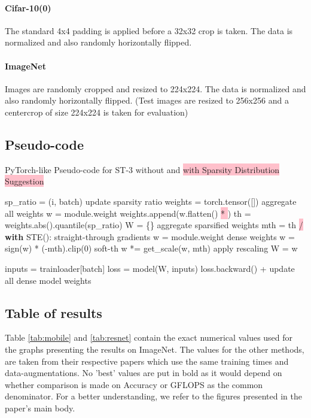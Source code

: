 \documentclass[10pt,twocolumn,letterpaper]{article}
\begin{document}
\paragraph{Cifar-10(0)} The standard 4x4 padding is applied before a 32x32 crop is taken. The data is normalized and also randomly horizontally flipped.
\paragraph{ImageNet}  Images are randomly cropped and resized to 224x224. The data is normalized and also randomly horizontally flipped. (Test images are resized to 256x256 and a centercrop of size 224x224 is taken for evaluation)

\subsection{Pseudo-code}

\begin{algorithm}[h]
\small
\caption{PyTorch-like Pseudo-code for ST-3\colorbox{pink}{} without and \colorbox{pink}{with Sparsity Distribution Suggestion}}
\label{alg:pseudo}
\begin{algorithmic}[1]   
\For {}
	\For {}
		\State sp\_ratio = (i, batch)
    	\Comment update sparsity ratio
    	\State weights = torch.tensor([])
		\Comment aggregate all weights    	
    		\State w = module.weight
    		\State weights.append(w.flatten() \colorbox{pink}{* })
    	\EndFor
		\State th = weights.abs().quantile(sp\_ratio)
\State W = \{\}
		\Comment aggregate sparsified weights
    		\State mth = th \colorbox{pink}{/ }
    		\State \textbf{with} STE():
			\Comment straight-through gradients
			\Indent
				\State w = module.weight
				\Comment dense weights
				\State w = sign(w) * (-mth).clip(0)
				\Comment soft-th
				\State w *= get\_scale(w, mth)
				\Comment apply rescaling
    			\State W = w
    		\EndIndent
    	\EndFor    	
    	
    	\State inputs = trainloader[batch]
    	\State loss = model(W, inputs)
    	\State loss.backward()
    	\Comment + update all dense model weights
    \EndFor
\EndFor
\Statex
\end{algorithmic}
  \vspace{-0.4cm}\end{algorithm}
\newpage
\subsection{Table of results}
Table \ref{tab:mobile} and \ref{tab:resnet} contain the exact numerical values used for the graphs presenting the results on ImageNet. The values for the other methods, are taken from their respective papers which use the same training times and data-augmentations. No 'best' values are put in bold as it would depend on whether comparison is made on Accuracy or GFLOPS as the common denominator. For a better understanding, we refer to the figures presented in the paper's main body.
\end{document}
